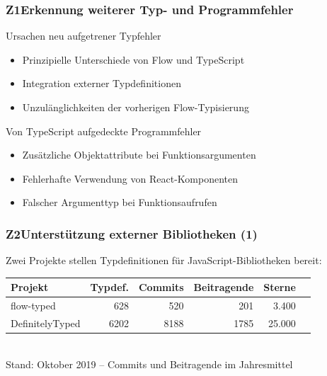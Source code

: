       \begin{frame}
        \frametitle{Z1\hspace{0.75em}Erkennung weiterer Typ- und Programmfehler}

        \begin{block}{Ursachen neu aufgetrener Typfehler}
          \begin{itemize}
            \item Prinzipielle Unterschiede von Flow und TypeScript
            \item Integration externer Typdefinitionen
            \item Unzulänglichkeiten der vorherigen Flow-Typisierung
          \end{itemize}
        \end{block}

        \begin{block}{Von TypeScript aufgedeckte Programmfehler}
          \begin{itemize}
            \item Zusätzliche Objektattribute bei Funktionsargumenten
            \item Fehlerhafte Verwendung von React-Komponenten
            \item Falscher Argumenttyp bei Funktionsaufrufen
          \end{itemize}
        \end{block}
      \end{frame}

      \begin{frame}
        \frametitle{Z2\hspace{0.75em}Unterstützung externer Bibliotheken (1)}
        Zwei Projekte stellen Typdefinitionen für JavaScript-Bibliotheken bereit:\\[1.5em]
        {
          \footnotesize
          \begin{tabu} to 
            \midrule
            \rowfont{\bfseries} Projekt & Typdef. & Commits & Beitragende & Sterne & {} \\
            \midrule
            flow-typed      &  628 &  520 &  201 &  3.400 & \autocite{FLOW_TYPED} \\
            DefinitelyTyped & 6202 & 8188 & 1785 & 25.000 & \autocite{DEFINITELY_TYPED} \\
            \midrule
          \end{tabu}
          \\[1em]
          Stand: Oktober 2019 -- Commits und Beitragende im Jahresmittel
        }
      \end{frame}

